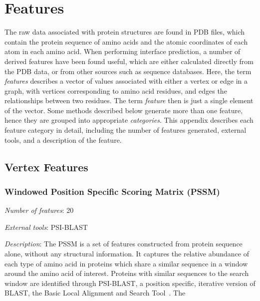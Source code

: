 \chapter{Features}
\label{appendix:features}

The raw data associated with protein structures are found in PDB files, which contain the protein sequence of amino acids and the atomic coordinates of each atom in each amino acid.
When performing interface prediction, a number of derived features have been found useful, which are either calculated directly from the PDB data, or from other sources such as sequence databases.
Here, the term \emph{features} describes a vector of values associated with either a vertex or edge in a graph, with vertices corresponding to amino acid residues, and edges the relationships between two residues.
The term \emph{feature} then is just a single element of the vector.
Some methods described below generate more than one feature, hence they are grouped into appropriate \emph{categories}.
This appendix describes each feature category in detail, including the number of features generated, external tools, and a description of the feature.

\section{Vertex Features}

\subsection{Windowed Position Specific Scoring Matrix (PSSM)}
\noindent
\emph{Number of features}: 20

\noindent
\emph{External tools}: PSI-BLAST~\cite{altschul1997}

\noindent
\emph{Description}:
The PSSM is a set of features constructed from protein sequence alone, without any structural information.
It captures the relative abundance of each type of amino acid in proteins which share a similar sequence in a window around the amino acid of interest.
Proteins with similar sequences to the search window are identified through PSI-BLAST, a position specific, iterative version of BLAST, the Basic Local Alignment and Search Tool~\cite{altschul1990}.
The 